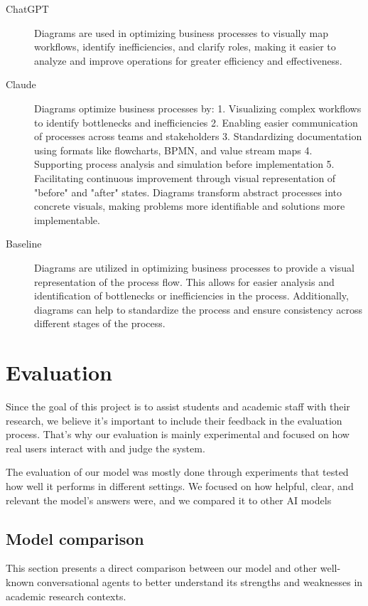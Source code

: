 \documentclass[fleqn,moreauthors,10pt]{ds_report}
\begin{document}
\begin{description}
	\item[ChatGPT] Diagrams are used in optimizing business processes to visually map workflows, identify inefficiencies, and clarify roles, making it easier to analyze and improve operations for greater efficiency and effectiveness.
	\item[Claude] Diagrams optimize business processes by: 1. Visualizing complex workflows to identify bottlenecks and inefficiencies 2. Enabling easier communication of processes across teams and stakeholders 3. Standardizing documentation using formats like flowcharts, BPMN, and value stream maps 4. Supporting process analysis and simulation before implementation 5. Facilitating continuous improvement through visual representation of "before" and "after" states. Diagrams transform abstract processes into concrete visuals, making problems more identifiable and solutions more implementable.
	\item[Baseline] Diagrams are utilized in optimizing business processes to provide a visual representation of the process flow. This allows for easier analysis and identification of bottlenecks or inefficiencies in the process. Additionally, diagrams can help to standardize the process and ensure consistency across different stages of the process.
\end{description}

\section*{Evaluation}


Since the goal of this project is to assist students and academic staff with their research, we believe it’s important to include their feedback in the evaluation process. That’s why our evaluation is mainly experimental and focused on how real users interact with and judge the system.

The evaluation of our model was mostly done through experiments that tested how well it performs in different settings. We focused on how helpful, clear, and relevant the model’s answers were, and we compared it to other AI models


\subsection*{Model comparison}

This section presents a direct comparison between our model and other well-known conversational agents to better understand its strengths and weaknesses in academic research contexts. 
\end{document}
